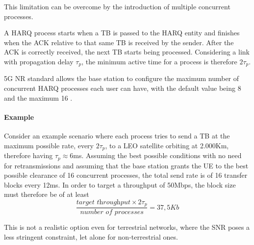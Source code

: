 This limitation can be overcome by the introduction of multiple concurrent processes.

A \ac{HARQ} process starts when a \ac{TB} is passed to the \ac{HARQ} entity and finishes when the \ac{ACK} relative to that same \ac{TB} is received by the sender. After the \ac{ACK} is correctly received, the next \ac{TB} starts being processed. Considering a link with propagation delay $\tau_p$, the minimum active time for a process is therefore $2\tau_p$. 

5G \ac{NR} standard allows the base station to configure the maximum number of concurrent \ac{HARQ} processes each user can have, with the default value being 8 and the maximum 16 \cite{3gpp-ts-38.300}. 

\paragraph{Example} Consider an example scenario where each process tries to send a \ac{TB} at the maximum possible rate, every $2\tau_p$, to a \ac{LEO} satellite orbiting at 2.000Km, therefore having $\tau_p\approx6$ms. Assuming the best possible conditions with no need for retransmissions and assuming that the base station grants the \ac{UE} to the best possible clearance of 16 concurrent processes, the total send rate is of 16 transfer blocks every 12ms. In order to target a throughput of 50Mbps, the block size must therefore be of at least $$\frac{\textit{target throughput} \times 2\tau_p}{\textit{number of processes}} = 37,5Kb$$

This is not a realistic option even for terrestrial networks, where the \ac{SNR} poses a less stringent constraint, let alone for non-terrestrial ones.




